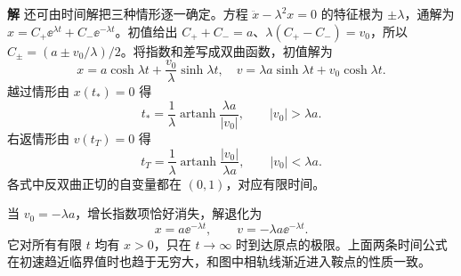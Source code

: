 \documentclass[11pt,openany,fontset=fandol]{ctexbook}
\theoremstyle{definition}\newtheorem{example}{例}[chapter]\newtheorem{exercise}{习题}[chapter]
\newcommand{\SolutionStart}{\par\medskip\ifdim\pagetotal>0pt\ifdim\dimexpr\pagegoal-\pagetotal\relax<3\baselineskip\newpage\fi\fi\noindent\textbf{解}\quad\ignorespaces}
\newenvironment{solution}{\SolutionStart}{\par\medskip}
\begin{document}
\begin{solution}
还可由时间解把三种情形逐一确定。方程 $\ddot x-\lambda^2x=0$ 的特征根为 $\pm\lambda$，通解为 $x=C_+\ee^{\lambda t}+C_-\ee^{-\lambda t}$。初值给出 $C_++C_-=a$、$\lambda(C_+-C_-)=v_0$，所以 $C_\pm=(a\pm v_0/\lambda)/2$。将指数和差写成双曲函数，初值解为
\[
x=a\cosh\lambda t+\frac{v_0}{\lambda}\sinh\lambda t,
\quad
v=\lambda a\sinh\lambda t+v_0\cosh\lambda t.
\]
越过情形由 $x(t_*)=0$ 得
\[
t_*=\frac1\lambda\operatorname{artanh}
\frac{\lambda a}{|v_0|},\qquad |v_0|>\lambda a.
\]
右返情形由 $v(t_T)=0$ 得
\[
t_T=\frac1\lambda\operatorname{artanh}
\frac{|v_0|}{\lambda a},\qquad |v_0|<\lambda a.
\]
各式中反双曲正切的自变量都在 $(0,1)$，对应有限时间。

当 $v_0=-\lambda a$，增长指数项恰好消失，解退化为
\[
x=a\ee^{-\lambda t},\qquad v=-\lambda a\ee^{-\lambda t}.
\]
它对所有有限 $t$ 均有 $x>0$，只在 $t\to\infty$ 时到达原点的极限。上面两条时间公式在初速趋近临界值时也趋于无穷大，和图中相轨线渐近进入鞍点的性质一致。
\end{solution}
\end{document}
